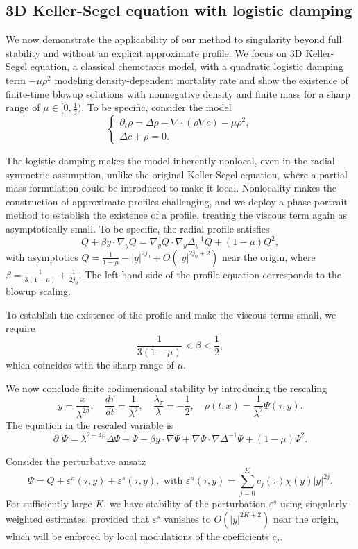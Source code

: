 \documentclass[12pt]{caltech_thesis}
\numberwithin{equation}{section}
\begin{document}
\subsection{3D Keller-Segel equation with logistic damping}
\label{subsec:3dks}
We now demonstrate the applicability of our method to singularity beyond full stability and without an explicit approximate profile. We focus on $3$D Keller-Segel equation, a classical chemotaxis model, with a quadratic logistic damping term $-\mu \rho^2$ modeling density-dependent mortality rate and show the existence of finite-time blowup solutions with nonnegative density and finite mass for a sharp range of $\mu \in \big[0,\frac{1}{3}\big)$. To be specific, consider the model 
$$
\begin{cases}
\partial_t \rho = \Delta \rho -  \nabla \cdot (\rho \nabla c) - \mu \rho^2, \\
\Delta c +\rho = 0.
\end{cases}$$

The logistic damping makes the model inherently nonlocal, even in the radial symmetric assumption, unlike the original Keller-Segel equation, where a partial mass formulation could be introduced to make it local. Nonlocality makes the construction of approximate profiles challenging, and we deploy a phase-portrait method to establish the existence of a profile, treating the viscous term again as asymptotically small. To be specific, the radial profile satisfies $$Q+\beta y \cdot \nabla_y Q = \nabla_y Q \cdot \nabla_y\Delta^{-1}_yQ + (1-\mu)Q^2,
$$ with asymptotics $Q=\frac{1}{1-\mu}-|y|^{2j_0}+O(|y|^{2j_0+2})$ near the origin, where $\beta=\frac{1}{3(1-\mu)}+\frac{1}{2j_0}$. The left-hand side of the profile equation corresponds to the blowup scaling. 

To establish the existence of the profile and make the viscous terms small, we require $$\frac{1}{3(1-\mu)} < \beta < \frac{1}{2},$$which coincides with the sharp range of $\mu$.  

We now conclude finite codimensional stability by introducing the rescaling $$y =\frac{x}{\lambda^{2\beta}}, \quad \frac{d\tau}{dt} = \frac{1}{\lambda^2}, \quad \frac{\lambda_\tau}{\lambda} = -\frac{1}{2},\quad \rho(t,x) = \frac{1}{\lambda^2} \Psi \left( \tau, y \right).$$
The equation in the rescaled variable is $$\partial_\tau \Psi = \lambda^{2-4\beta} \Delta \Psi - \Psi - \beta y \cdot \nabla \Psi + \nabla \Psi \cdot \nabla \Delta^{-1} \Psi + (1-\mu) \Psi^2.$$ 

Consider the perturbative ansatz $$\Psi=Q+\varepsilon^u(\tau,y) + \varepsilon^s(\tau,y),
\text{ with } \varepsilon^u(\tau,y) = \sum_{j=0}^K c_j(\tau) \chi(y) |y|^{2j}.$$
For sufficiently large $K$, we have stability of the perturbation $\varepsilon^s$ using singularly-weighted estimates, provided that $\varepsilon^s$ vanishes to $O(|y|^{2K+2})$ near the origin, which will be enforced by local modulations of the coefficients $c_j$.
\end{document}
